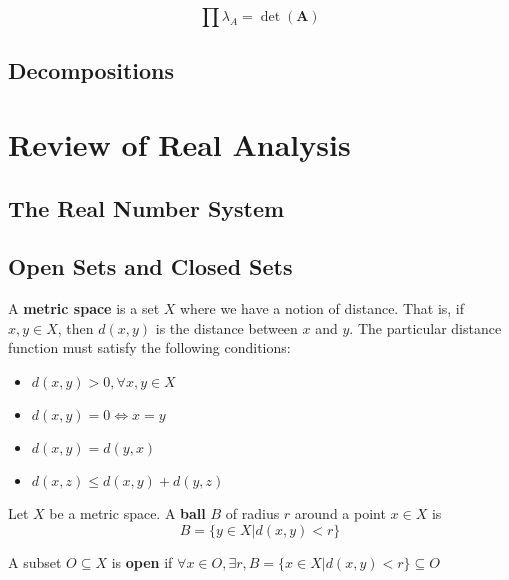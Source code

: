 			\begin{corollary}
				\begin{equation}
					\prod \lambda_A = \det(\mathbf{A})
				\end{equation}
			\end{corollary}


		\section{Decompositions}

	\chapter{Review of Real Analysis}
		\section{The Real Number System}

		\section{Open Sets and Closed Sets}
			\begin{definition}
				A \textbf{metric space} is a set $X$ where we have a notion of distance. That is, if $x, y \in X$, then $d(x, y)$ is the distance between $x$ and $y$. The particular distance function must satisfy the following conditions:
				\begin{itemize}
					\item $d(x, y) > 0, \forall x, y \in X$
					\item $d(x, y) = 0 \iff x=y$
					\item $d(x, y) = d(y, x)$
					\item $d(x, z) \le d(x, y) + d(y, z)$
				\end{itemize}
			\end{definition}

			\begin{definition}[Ball]
				Let $X$ be a metric space. A \textbf{ball} $B$ of radius $r$ around a point $x \in X$ is
				\begin{equation}
					B = \{y \in X|d(x, y) < r\}
				\end{equation}
			\end{definition}

			\begin{definition}
				A subset $O \subseteq X$ is \textbf{open} if $\forall x \in O, \exists r, B=\{x\in X|d(x, y) < r\} \subseteq O$
			\end{definition}

